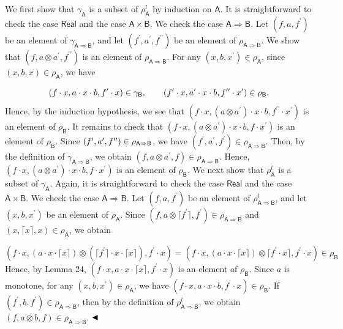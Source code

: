 We first show that $\gamma_{\mathsf{A}}$ is a subset of $\rho^{l}_{\mathsf{A}}$ by induction on $\mathsf{A}$. It is straightforward to check the case $\mathsf{Real}$ and the case $\mathsf{A}\times\mathsf{B}$. We check the case $\mathsf{A}\Rightarrow\mathsf{B}$. Let $(f,a,f^{\prime})$ be an element of $\gamma_{\mathsf{A}\Rightarrow\mathsf{B}}$, and let $(f^{\prime},a^{\prime},f^{\prime\prime})$ be an element of $\rho_{\mathsf{A}\Rightarrow\mathsf{B}}$. We show that $(f,a\otimes a^{\prime},f^{\prime\prime})$ is an element of $\rho_{\mathsf{A}\Rightarrow\mathsf{B}}$. For any $(x,b,x^{\prime})\in\rho_{\mathsf{A}}$, since $(x,b,x)\in\rho_{\mathsf{A}}$, we have\par
    \[(f\cdot x,a\cdot x\cdot b,f^{\prime}\cdot x)\in\gamma_{\mathsf{B}},\qquad(f^{%
\prime}\cdot x,a^{\prime}\cdot x\cdot b,f^{\prime\prime}\cdot x^{\prime})\in%
\rho_{\mathsf{B}}.\]    
Hence, by the induction hypothesis, we see that $(f\cdot x,(a\otimes a^{\prime})\cdot x\cdot b,f^{\prime\prime}\cdot x^{\prime})$ is an element of $\rho_{\mathsf{B}}$. It remains to check that $(f\cdot x,(a\otimes a^{\prime})\cdot x\cdot b,f\cdot x^{\prime})$ is an element of $\rho_{\mathsf{B}}$. Since $(f^{\prime},a^{\prime},f^{\prime\prime})\in\rho_{\mathsf{A}\Rightarrow\mathsf{%
B}}$, we have $(f^{\prime},a^{\prime},f^{\prime})\in\rho_{\mathsf{A}\Rightarrow\mathsf{B}}$. Then, by the definition of $\gamma_{\mathsf{A}\Rightarrow\mathsf{B}}$, we obtain $(f,a\otimes a^{\prime},f)\in\rho_{\mathsf{A}\Rightarrow\mathsf{B}}$. Hence, $(f\cdot x,(a\otimes a^{\prime})\cdot x\cdot b,f\cdot x^{\prime})$ is an element of $\rho_{\mathsf{B}}$. We next show that $\rho^{l}_{\mathsf{A}}$ is a subset of $\gamma_{\mathsf{A}}$. Again, it is straightforward to check the case $\mathsf{Real}$ and the case $\mathsf{A}\times\mathsf{B}$. We check the case $\mathsf{A}\Rightarrow\mathsf{B}$. Let $(f,a,f^{\prime})$ be an element of $\rho^{l}_{\mathsf{A}\Rightarrow\mathsf{B}}$, and let $(x,b,x^{\prime})$ be an element of $\rho_{\mathsf{A}}$. Since $(f,a\otimes\lceil f^{\prime}\rceil,f^{\prime})\in\rho_{\mathsf{A}\Rightarrow%
\mathsf{B}}$ and $(x,\lceil x\rceil,x)\in\rho_{\mathsf{A}}$, we obtain\par
    \[(f\cdot x,(a\cdot x\cdot\lceil x\rceil)\otimes(\lceil f^{\prime}\rceil\cdot x%
\cdot\lceil x\rceil),f^{\prime}\cdot x)=(f\cdot x,(a\cdot x\cdot\lceil x\rceil%
)\otimes\lceil f^{\prime}\cdot x\rceil,f^{\prime}\cdot x)\in\rho_{\mathsf{B}}\]    
Hence, by Lemma 24, $(f\cdot x,a\cdot x\cdot\lceil x\rceil,f^{\prime}\cdot x)$ is an element of $\rho_{\mathsf{B}}$. Since $a$ is monotone, for any $(x,b,x^{\prime})\in\rho_{\mathsf{A}}$, we have $(f\cdot x,a\cdot x\cdot b,f^{\prime}\cdot x)\in\rho_{\mathsf{B}}$. If $(f^{\prime},b,f^{\prime})\in\rho_{\mathsf{A}\Rightarrow\mathsf{B}}$, then by the definition of $\rho^{l}_{\mathsf{A}\Rightarrow\mathsf{B}}$, we obtain $(f,a\otimes b,f)\in\rho_{\mathsf{A}\Rightarrow\mathsf{B}}$. $\hfill\blacktriangleleft$\par
 
